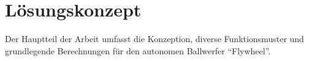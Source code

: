 \section{Lösungskonzept}
Der Hauptteil der Arbeit umfasst die Konzeption, diverse Funktionsmuster und grundlegende Berechnungen für den autonomen Ballwerfer \enquote{Flywheel}.